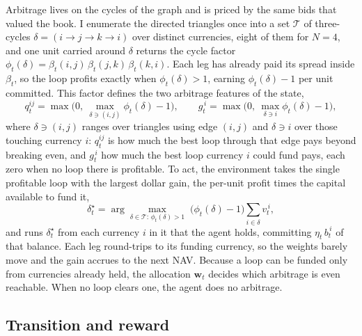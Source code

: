 \documentclass[12pt,a4paper]{article}
\begin{document}
Arbitrage lives on the cycles of the graph and is priced by the same bids that valued the book.
I enumerate the directed triangles once into a set $\mathcal{T}$ of three-cycles
$\delta=(i\!\to\!j\!\to\!k\!\to\!i)$ over distinct currencies, eight of them for $N=4$, and one
unit carried around $\delta$ returns the cycle factor
$\phi_t(\delta)=\beta_t(i,j)\,\beta_t(j,k)\,\beta_t(k,i)$. Each leg has already paid its spread
inside $\beta_t$, so the loop profits exactly when $\phi_t(\delta)>1$, earning $\phi_t(\delta)-1$
per unit committed. This factor defines the two arbitrage features of the state,
\begin{equation}
q_t^{ij}=\max\!\Big(0,\ \max_{\delta\ni(i,j)}\phi_t(\delta)-1\Big),\qquad
g_t^{\,i}=\max\!\Big(0,\ \max_{\delta\ni i}\phi_t(\delta)-1\Big),
\label{eq:arbfeat}
\end{equation}
where $\delta\ni(i,j)$ ranges over triangles using edge $(i,j)$ and $\delta\ni i$ over those
touching currency $i$: $q_t^{ij}$ is how much the best loop through that edge pays beyond breaking
even, and $g_t^{\,i}$ how much the best loop currency $i$ could fund pays, each zero when no loop
there is profitable. To act, the environment takes the single profitable loop with the largest
dollar gain, the per-unit profit times the capital available to fund it,
\begin{equation}
\delta_t^\star=\arg\max_{\delta\in\mathcal{T}:\,\phi_t(\delta)>1}\;\big(\phi_t(\delta)-1\big)\!\!\sum_{i\in\delta} v_t^{\,i},
\label{eq:bestcycle}
\end{equation}
and runs $\delta_t^\star$ from each currency $i$ in it that the agent holds, committing
$\eta_t\,b_t^{\,i}$ of that balance. Each leg round-trips to its funding currency, so the weights
barely move and the gain accrues to the next NAV. Because a loop can be funded only from
currencies already held, the allocation $\mathbf{w}_t$ decides which arbitrage is even reachable.
When no loop clears one, the agent does no arbitrage.

\subsection{Transition and reward}
\end{document}
